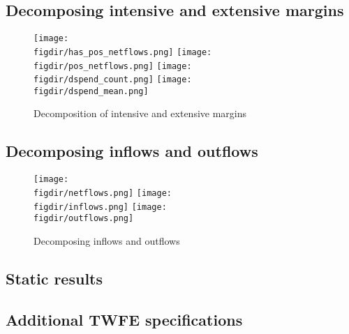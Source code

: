 



\subsection{Decomposing intensive and extensive margins}%
\label{sub:decomposing_intensive_and_extensive_margins}

\begin{figure}[H]
    \centering
    \caption{Decomposition of intensive and extensive margins}%
    \label{fig:intext}
    \texttt{[image: \\figdir/has\_pos\_netflows.png]}
    \texttt{[image: \\figdir/pos\_netflows.png]}
    \texttt{[image: \\figdir/dspend\_count.png]}
    \texttt{[image: \\figdir/dspend\_mean.png]}
\end{figure}


% 


\subsection{Decomposing inflows and outflows}%
\label{sub:decomposing_inflows_and_outflows}

\begin{figure}[H]
    \centering
    \caption{Decomposing inflows and outflows}%
    \label{fig:inout}
    \texttt{[image: \\figdir/netflows.png]}
    \texttt{[image: \\figdir/inflows.png]}
    \texttt{[image: \\figdir/outflows.png]}
\end{figure}





\subsection{Static results}%
\label{sub:static_results}





\subsection{Additional TWFE specifications}%
\label{sub:additional_twfe_specifications}

